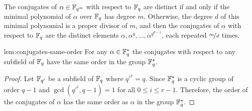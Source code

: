 The conjugates of $\alpha\in\mathbb{F}_{q^m}$ with respect to $\mathbb{F}_q$ are distinct if and only if the minimal polynomial of $\alpha$ over $\mathbb{F}_q$ has degree $m$. Otherwise, the degree $d$ of this minimal polynomial is a proper divisor of $m$, and then the conjugates of $\alpha$ with respect to $\mathbb{F}_q$ are the distinct elements $\alpha,\alpha^q ,\dots,\alpha^{q^{d-1}}$, each repeated $\nicefrac{m}d$ times.
\begin{lemma}{}{lem:conjugates-same-order}
  For any $\alpha\in\mathbb{F}_{q}^*$ the conjugates with respect to any subfield of $\mathbb{F}_q$ have the same order in the group $\mathbb{F}_q^*$.
\end{lemma}
\begin{proof}
  Let $\mathbb{F}_{q'}$ be a subfield of $\mathbb{F}_q$ where $q'^r=q$. Since $\mathbb{F}_q^*$ is a cyclic group of order $q-1$ and $\gcd(q'^i,q-1) =1$ for all $0\leq i\leq r-1$. Therefore, the order of the conjugates of $\alpha$ has the same order as $\alpha$ in the group $\mathbb{F}_q^*$.  
\end{proof}